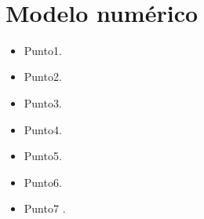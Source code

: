 \fontsize{14}{15}\selectfont
\blindtext\\

\section{Modelo numérico}
\blindtext
\begin{itemize}
	\item Punto1.
	\item Punto2.
	\item Punto3.
	\item Punto4.
	\item Punto5.
	\item Punto6.
	\item Punto7 \citep{allmendinger_invited_2010}. %
\end{itemize}